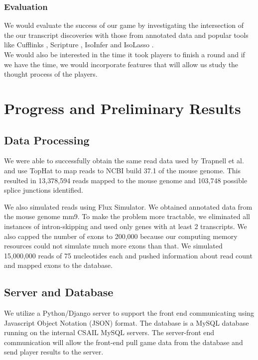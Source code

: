 \documentclass[12pt]{article}
\begin{document}
\subsubsection*{Evaluation}
We would evaluate the success of our game by investigating the intersection of the our transcript discoveries with those from annotated data and popular tools like Cufflinks \citep{trapnell2010transcript}, Scripture \citep{guttman2010ab} , IsoInfer \citep{feng2010inference} and IsoLasso \citep{li2011isolasso}. \\
We would also be interested in the time it took players to finish a round and if we have the time, we would incorporate features that will allow us study the thought process of the players.

\section*{Progress and Preliminary Results}

\subsection*{Data Processing}
We were able to successfully obtain the same read data used by Trapnell et al. \citep{trapnell2010transcript} and use TopHat to map reads to NCBI build 37.1 of the mouse genome.
This resulted in 13,378,594 reads mapped to the mouse genome and 103,748 possible splice junctions identified. 

We also simulated reads using Flux Simulator. We obtained annotated data from the mouse genome mm9. To make the problem more tractable, we eliminated all instances of intron-skipping and used only genes with at least 2 transcripts. We also capped the number of exons to 200,000 because our computing memory resources could not simulate much more exons than that. We simulated 15,000,000 reads of 75 nucleotides each and pushed information about read count and mapped exons to the database.

\subsection*{Server and Database}
We utilize a Python/Django server to support the front end communicating using Javascript Object Notation (JSON) format. The database is a MySQL database running on the internal CSAIL MySQL servers. The server-front end communication will allow the front-end pull game data from the database and send player results to the server.
\end{document}
